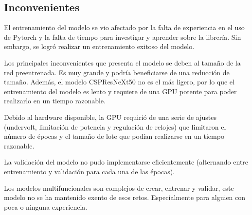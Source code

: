 \subsection{Inconvenientes}
El entrenamiento del modelo se vio afectado por la falta de experiencia en el uso de Pytorch y la falta de tiempo para investigar y aprender sobre la librería. Sin embargo, se logró realizar un entrenamiento exitoso del modelo.

Los principales inconvenientes que presenta el modelo se deben al tamaño de la red preentrenada. Es muy grande y podría beneficiarse de una reducción de tamaño. Además, el modelo CSPResNeXt50 no es el más ligero, por lo que el entrenamiento del modelo es lento y requiere de una GPU potente para poder realizarlo en un tiempo razonable.

Debido al hardware disponible, la GPU requirió de una serie de ajustes (undervolt, limitación de potencia y regulación de relojes) que limitaron el número de épocas y el tamaño de lote que podían realizarse en un tiempo razonable.

La validación del modelo no pudo implementarse eficientemente (alternando entre entrenamiento y validación para cada una de las épocas).

Los modelos multifuncionales son complejos de crear, entrenar y validar, este modelo no se ha mantenido exento de esos retos. Especialmente para alguien con poca o ninguna experiencia.
